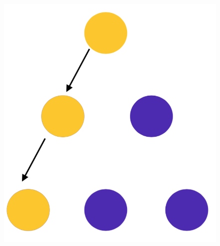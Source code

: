 \documentclass[10pt,a4paper]{article}
\begin{document}
\begin{figure}[h!]
\begin{minipage}{.3\textwidth}
  \includegraphics[width=.8\linewidth]{images/di-sch3.png}
  \label{fig:di-sch3}
\end{minipage}
\end{figure} 
\end{document}
